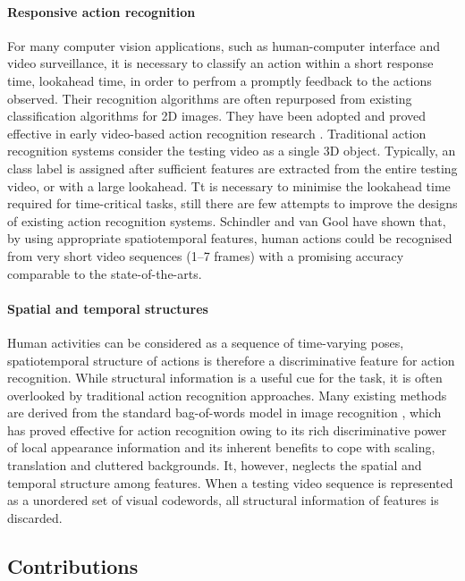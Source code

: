 \paragraph{Responsive action recognition}  
For many computer vision applications, such as human-computer interface and video surveillance, it is necessary to classify an action within a short response time, \ie lookahead time, in order to perfrom a promptly feedback to the actions observed. 
Their recognition algorithms are often repurposed from existing classification algorithms for 2D images. They have been adopted and proved effective in early video-based action recognition research \cite{Schuldt2004, Dollar2005}.  
Traditional action recognition systems consider the testing video as a single 3D object. 
Typically, an class label is assigned after sufficient features are extracted from the entire testing video, or with a large lookahead. Tt is necessary to minimise the lookahead time required for time-critical tasks, still there are few attempts to improve the designs of existing action recognition systems.  
Schindler and van Gool \cite{Schindler2008} have shown that, by using appropriate spatiotemporal features, human actions could be recognised from very short video sequences (1--7 frames) with a promising accuracy comparable to the state-of-the-arts.

\paragraph{Spatial and temporal structures}
Human activities can be considered as a sequence of time-varying poses, spatiotemporal structure of actions is therefore a discriminative feature for action recognition.  
While structural information is a useful cue for the task, it is often overlooked by traditional action recognition approaches.  
Many existing methods are derived from the standard bag-of-words model in image recognition \cite{Sivic2005, Fei-Fei2005}, which has proved effective for action recognition owing to its rich discriminative power of local appearance information and its inherent benefits to cope with scaling, translation and cluttered backgrounds. 
It, however, neglects the spatial and temporal structure among features. 
When a testing video sequence is represented as a unordered set of visual codewords, all structural information of features is discarded. 

\subsection{Contributions}

